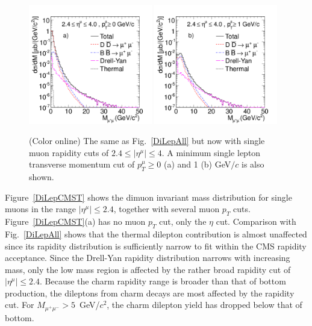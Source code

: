 \begin{figure}
\includegraphics[width=0.48\textwidth]{chap_DiMuonContinuum_figures/Fig9a_Eta4Pt0}
\includegraphics[width=0.48\textwidth]{chap_DiMuonContinuum_figures/Fig9b_Eta4Pt1}
\caption{(Color online) The same as Fig.~\protect\ref{DiLepAll} 
but now with single muon
rapidity cuts of $2.4 \leq |\eta^\mu| \leq 4$.  
A minimum single lepton transverse 
momentum cut of $p_T^\mu \geq 0$ (a) and 1 (b) GeV$/c$ is also shown.}
\label{DiLepALI}
\end{figure}

Figure~\ref{DiLepCMST} shows the dimuon invariant mass distribution for single
muons in the range $|\eta^{\mu}|\leq 2.4$, together with several muon $p_T$ 
cuts. Figure~\ref{DiLepCMST}(a) has no muon $p_T$ cut, only the $\eta$ cut.
Comparison with Fig.~\ref{DiLepAll} shows that the thermal dilepton contribution
is almost unaffected since its rapidity distribution is sufficiently narrow 
to fit within the CMS rapidity acceptance.  Since the Drell-Yan rapidity
distribution narrows with increasing mass, only the low mass region is affected
by the rather broad rapidity cut of  $|\eta^{\mu}|\leq 2.4$.  Because the charm
rapidity range is broader than that of bottom production, the dileptons from
charm decays are most affected by the rapidity cut. For $M_{\mu^+ \mu^-} > 
5$~GeV/$c^2$, the charm dilepton yield has dropped below that of bottom.


